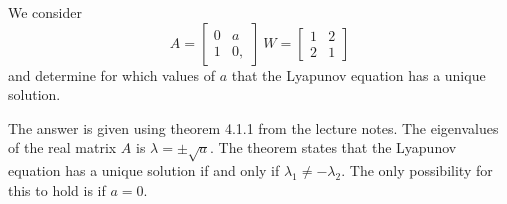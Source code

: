 We consider
\begin{equation}
A = \begin{bmatrix}
0 & a \\ 1 & 0,
\end{bmatrix}\medspace
W = \begin{bmatrix}
1 & 2 \\ 2 & 1
\end{bmatrix}
\end{equation} 
and determine for which values of $a$ that the Lyapunov equation has a unique solution. 

The answer is given using theorem 4.1.1 from the lecture notes. The eigenvalues of the real matrix $A$ is $\lambda = \pm\sqrt{a}$. The theorem states that the Lyapunov equation has a unique solution if and only if $\lambda_1\neq-\lambda_2$. The only possibility for this to hold is if $a=0$. 